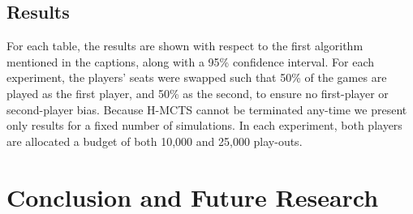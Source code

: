 \documentclass[a4paper]{llncs}
\begin{document}
\subsection{Results}
\label{subsec:results}

For each table, the results are shown with respect to the first algorithm mentioned in the captions, along with a 95\% confidence interval. For each experiment, the players' seats were swapped such that 50\% of the games are played as the first player, and 50\% as the second, to ensure no first-player or second-player bias. Because H-MCTS cannot be terminated any-time we present only results for a fixed number of simulations. In each experiment, both players are allocated a budget of both 10,000 and 25,000 play-outs.

\section{Conclusion and Future Research}
\label{sec:concl}



\end{document}
